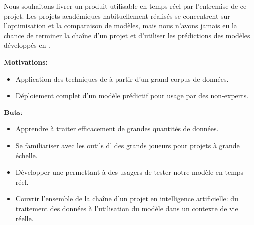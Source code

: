 Nous souhaitons livrer un produit utilisable en temps réel par l'entremise de ce projet. 
Les projets académiques habituellement réalisés se concentrent sur l'optimisation et la comparaison de modèles, mais nous n'avons jamais eu la chance de terminer la chaîne d'un projet et d'utiliser les prédictions des modèles développés en .

\vspace{5mm}
\textbf{Motivations:}
\begin{itemize}
  \item Application des techniques de  à partir d'un grand corpus de données.
  \item Déploiement complet d'un modèle prédictif pour usage par des non-experts.
\end{itemize}

\vspace{0mm}
\textbf{Buts:}
\begin{itemize}
  \item Apprendre à traiter efficacement de grandes quantités de données.
  \item Se familiariser avec les outils d' des grands joueurs pour projets à grande échelle.
  \item Développer une  permettant à des usagers de tester notre modèle en temps réel.
  \item Couvrir l'ensemble de la chaîne d'un projet en intelligence artificielle: du traitement des données à l'utilisation du modèle dans un contexte de vie réelle.
\end{itemize}